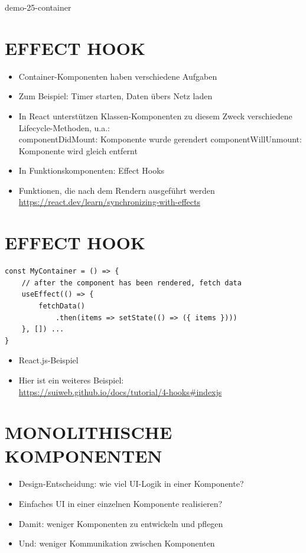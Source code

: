 demo-25-container

\section*{EFFECT HOOK}
\begin{itemize}
  \item Container-Komponenten haben verschiedene Aufgaben
  \item Zum Beispiel: Timer starten, Daten übers Netz laden
  \item In React unterstützen Klassen-Komponenten zu diesem Zweck verschiedene Lifecycle-Methoden, u.a.:\\
componentDidMount: Komponente wurde gerendert componentWillUnmount: Komponente wird gleich entfernt
  \item In Funktionskomponenten: Effect Hooks
  \item Funktionen, die nach dem Rendern ausgeführt werden\\
\href{https://react.dev/learn/synchronizing-with-effects}{https://react.dev/learn/synchronizing-with-effects}
\end{itemize}

\section*{EFFECT HOOK}
\begin{verbatim}
const MyContainer = () => {
    // after the component has been rendered, fetch data
    useEffect(() => {
        fetchData()
            .then(items => setState(() => ({ items })))
    }, []) ...
}
\end{verbatim}

\begin{itemize}
  \item React.js-Beispiel
  \item Hier ist ein weiteres Beispiel:\\
\href{https://suiweb.github.io/docs/tutorial/4-hooks#indexjs}{https://suiweb.github.io/docs/tutorial/4-hooks\#indexjs}
\end{itemize}

\section*{MONOLITHISCHE KOMPONENTEN}
\begin{itemize}
  \item Design-Entscheidung: wie viel UI-Logik in einer Komponente?
  \item Einfaches UI in einer einzelnen Komponente realisieren?
  \item Damit: weniger Komponenten zu entwickeln und pflegen
  \item Und: weniger Kommunikation zwischen Komponenten
\end{itemize}

